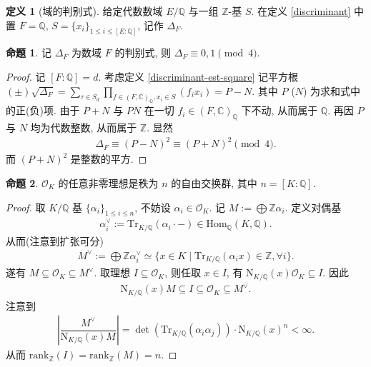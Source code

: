 \documentclass{MainStyle}
\theoremstyle{definition}
\theoremstyle{definition}
\theoremstyle{definition}
\newtheorem{definition}{定义}
\theoremstyle{definition}
\newtheorem{proposition}{命题}
\theoremstyle{definition}
\theoremstyle{definition}
\theoremstyle{definition}
\theoremstyle{remark}
\theoremstyle{remark}
\begin{document}
\begin{definition}[域的判别式]
    给定代数数域 $E/\mathbb Q$ 与一组 $\mathbb Z$-基 $S$. 在定义 \ref{discriminant} 中置 $F=\mathbb Q$, $S=\{x_i\}_{1\leq i\leq [E:\mathbb Q]}$, 记作 $\Delta_F$.
\end{definition}

\begin{proposition}
    记 $\Delta _F$ 为数域 $F$ 的判别式, 则 $\Delta_F\equiv 0,1\pmod 4$.
    \begin{proof}
        记 $[F:\mathbb Q]=d$. 考虑定义 \ref{discriminant-est-square} 记平方根 $(\pm)\sqrt{\Delta_F}=\sum_{\tau \in S_d}\prod_{f\in (F,\mathbb C)_{\mathbb Q},x_i\in S}(f_i x_i)=P-N$. 其中 $P$ ($N$) 为求和式中的正(负)项. 由于 $P+N$ 与 $PN$ 在一切 $f_i\in (F,\mathbb C)_{\mathbb Q}$ 下不动, 从而属于 $\mathbb Q$. 再因 $P$ 与 $N$ 均为代数整数, 从而属于 $\mathbb Z$. 显然
        \begin{align*}
            \Delta_F\equiv (P-N)^2\equiv (P+N)^2\pmod 4.
        \end{align*}
        而 $(P+N)^2$ 是整数的平方.
    \end{proof}
\end{proposition}

\begin{proposition}\label{ideal-dedekind}
    $\mathcal O_K$ 的任意非零理想是秩为 $n$ 的自由交换群, 其中 $n=[K:\mathbb Q]$.
    \begin{proof}
        取 $K/\mathbb Q$ 基 $\{\alpha_i\}_{1\leq i\leq n}$, 不妨设 $\alpha_i\in \mathcal O_K$. 记 $M:=\bigoplus \mathbb Z\alpha_i$. 定义对偶基
        \begin{align*}
            \alpha_i^\vee :=\mathrm{Tr}_{K/\mathbb Q}(\alpha_i\cdot -)\in \mathrm{Hom}_{\mathbb Q}(K,\mathbb Q).
        \end{align*}
        从而(注意到扩张可分)
        \begin{align*}
            M^\vee :=\bigoplus \mathbb Z\alpha_i^\vee \simeq \{x\in K\mid \mathrm{Tr}_{K/\mathbb Q}(\alpha_ix)\in \mathbb Z,\forall i\}.
        \end{align*}
        遂有 $M\subseteq \mathcal O_K\subseteq M^\vee$. 取理想 $I\subseteq \mathcal O_K$, 则任取 $ x\in I$, 有 $\mathrm{N}_{K/\mathbb Q}(x)\mathcal O_K\subseteq  I$. 因此
        \begin{align*}
            \mathrm{N}_{K/\mathbb Q}(x)M\subseteq  I\subseteq \mathcal O_K\subseteq M^\vee.
        \end{align*}
        注意到
        \begin{align*}
            \left|\dfrac{M^\vee}{\mathrm{N}_{K/\mathbb Q}(x)M}\right|=\det (\mathrm{Tr}_{K/\mathbb Q}(\alpha_i\alpha_j))\cdot \mathrm{N}_{K/\mathbb Q} (x)^n<\infty.
        \end{align*}
        从而 $\mathrm{rank}_{\mathbb Z}(I)=\mathrm{rank}_{\mathbb Z}(M)=n$.
    \end{proof}
\end{proposition}
\end{document}

